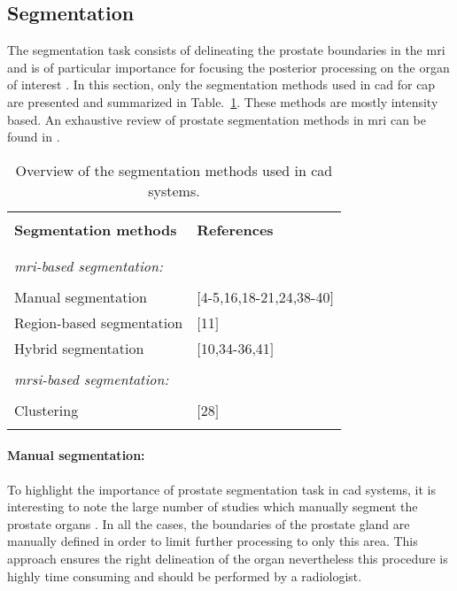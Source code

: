 \subsection{Segmentation}\label{subsec:chp3:img-reg:seg}
The segmentation task consists of delineating the prostate boundaries in the \ac{mri} and is of particular importance for focusing the posterior processing on the organ of interest \cite{Ghose2012}. 
In this section, only the segmentation methods used in \ac{cad} for \ac{cap} are presented and summarized in Table.~\ref{tab:summary-seg}.
These methods are mostly intensity based.
 An exhaustive review of prostate segmentation methods in \ac{mri} can be found in \cite{Ghose2012}.


\begin{table}
	\caption{Overview of the segmentation methods used in \ac{cad} systems.}
	\small
	\begin{tabular}{p{.65\linewidth} p{.25\linewidth}}
		\hline \\ [-1.5ex]
		\textbf{Segmentation methods} & \textbf{References} \\ \\ [-1.5ex]
		\hline \\ [-1.5ex]
		\textit{\ac{mri}-based segmentation:} & \\ \\ [-1.5ex]
		\quad Manual segmentation & $[$4-5,16,18-21,24,38-40$]$ \\
		\quad Region-based segmentation & $[$11$]$ \\
		\quad Hybrid segmentation & $[$10,34-36,41$]$ \\ \\ [-1.5ex]
		\textit{\ac{mrsi}-based segmentation:} & \\ \\ [-1.5ex]
		\quad Clustering & $[$28$]$ \\ \\ [-1.5ex]
		\hline
	\end{tabular}
\label{tab:summary-seg}
\end{table}


\paragraph{Manual segmentation:}
To highlight the importance of prostate segmentation task in \ac{cad} systems, it is interesting to note the large number of studies which manually segment the prostate organs \cite{Artan2009,Artan2010,Matulewicz2013,Niaf2011,Niaf2012,Ozer2009,Ozer2010,Puech2009,Vos2008,Vos2008a}.
In all the cases, the boundaries of the prostate gland are manually defined in order to limit further processing to only this area.
This approach ensures the right delineation of the organ nevertheless this procedure is highly time consuming and should be performed by a radiologist.


